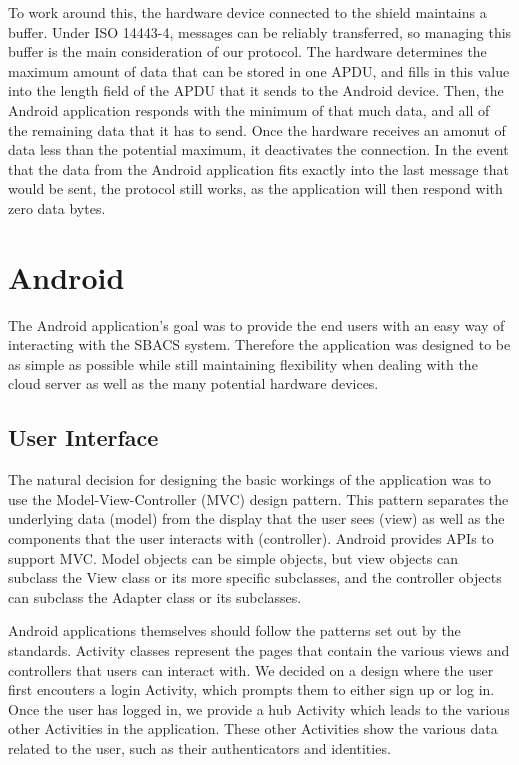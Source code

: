 \documentclass[12pt]{report}
\begin{document}
To work around this, the hardware device connected to the shield maintains a buffer. Under ISO 14443-4, messages can be
reliably transferred, so managing this buffer is the main consideration of our protocol. The hardware determines the
maximum amount of data that can be stored in one APDU, and fills in this value into the length field of the APDU that it
sends to the Android device. Then, the Android application responds with the minimum of that much data,  and all of the
remaining data that it has to send. Once the hardware receives an amonut of data less than the potential maximum, it
deactivates the connection. In the event that the data from the Android application fits exactly into the last message
that would be sent, the protocol still works, as the application will then respond with zero data bytes.



\section{Android}

The Android application's goal was to provide the end users with an easy way of interacting with the SBACS system.
Therefore the application was designed to be as simple as possible while still maintaining flexibility when dealing with
the cloud server as well as the many potential hardware devices.


\subsection{User Interface}

The natural decision for designing the basic workings of the application was to use the Model-View-Controller (MVC) 
design pattern. This pattern separates the underlying data (model) from the display that the user sees (view) as well as
the components that the user interacts with (controller). Android provides APIs to support MVC. Model objects can be
simple objects, but view objects can subclass the View class or its more specific subclasses, and the controller
objects can subclass the Adapter class or its subclasses.

Android applications themselves should follow the patterns set out by the standards. Activity classes represent the
pages that contain the various views and controllers that users can interact with. We decided on a design where the user
first encouters a login Activity, which prompts them to either sign up or log in. Once the user has logged in, we
provide a hub Activity which leads to the various other Activities in the application. These other Activities show the
various data related to the user, such as their authenticators and identities.
\end{document}
